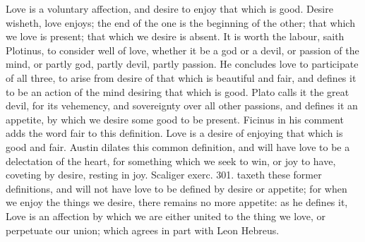{Love is a voluntary affection, and desire to enjoy that which is
good. Desire wisheth, love enjoys; the end of the one is the
beginning of the other; that which we love is present; that which we
desire is absent. It is worth the labour, saith Plotinus, to
consider well of love, whether it be a god or a devil, or passion of
the mind, or partly god, partly devil, partly passion. He concludes
love to participate of all three, to arise from desire of that which is
beautiful and fair, and defines it to be an action of the mind desiring
that which is good. Plato calls it the great devil, for its
vehemency, and sovereignty over all other passions, and defines it an
appetite, by which we desire some good to be present. Ficinus in
his comment adds the word fair to this definition. Love is a desire of
enjoying that which is good and fair. Austin dilates this common
definition, and will have love to be a delectation of the heart,
for something which we seek to win, or joy to have, coveting by
desire, resting in joy. Scaliger exerc. 301. taxeth these former
definitions, and will not have love to be defined by desire or
appetite; for when we enjoy the things we desire, there remains no more
appetite: as he defines it, Love is an affection by which we are either
united to the thing we love, or perpetuate our union; which agrees in
part with Leon Hebreus.

}
